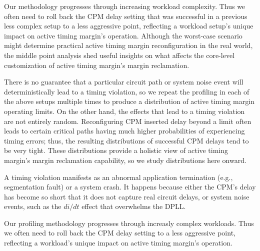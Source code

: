 Our methodology progresses through increasing workload complexity. Thus we often need to roll back the CPM delay setting that was successful in a previous less complex setup to a less aggressive point, reflecting a workload setup's unique impact on active timing margin's operation. Although the worst-case scenario might determine practical active timing margin reconfiguration in the real world, the middle point analysis shed useful insights on what affects the core-level customization of active timing margin's margin reclamation.

There is no guarantee that a particular circuit path or system noise event will deterministically lead to a timing violation, so we repeat the profiling in each of the above setups multiple times to produce a distribution of active timing margin operating limits. On the other hand, the effects that lead to a timing violation are not entirely random. Reconfiguring CPM inserted delay beyond a limit often leads to certain critical paths having much higher probabilities of experiencing timing errors; thus, the resulting distributions of successful CPM delays tend to be very tight. These distributions provide a holistic view of active timing margin's margin reclamation capability, so we study distributions here onward.

A timing violation manifests as an abnormal application termination (e.g., segmentation fault) or a system crash. It happens because either the CPM's delay has become so short that it does not capture real circuit delays, or system noise events, such as the $di/dt$ effect that overwhelms the DPLL.

Our profiling methodology progresses through increasly complex workloads. Thus we often need to roll back the CPM delay setting to a less aggressive point, reflecting a workload's unique impact on active timing margin's operation.

